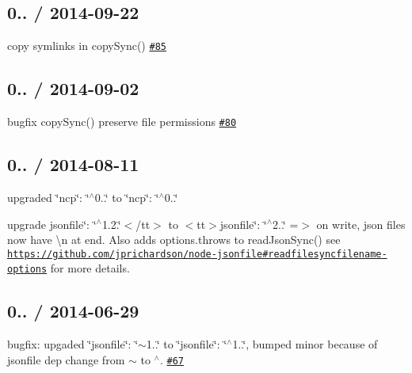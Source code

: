 \subsection*{0.. / 2014-\/09-\/22 }


\begin{DoxyItemize}
\item copy symlinks in {\ttfamily copy\+Sync()} \href{https://github.com/jprichardson/node-fs-extra/pull/85}{\tt \#85}
\end{DoxyItemize}

\subsection*{0.. / 2014-\/09-\/02 }


\begin{DoxyItemize}
\item bugfix {\ttfamily copy\+Sync()} preserve file permissions \href{https://github.com/jprichardson/node-fs-extra/pull/80}{\tt \#80}
\end{DoxyItemize}

\subsection*{0.. / 2014-\/08-\/11 }


\begin{DoxyItemize}
\item upgraded {\ttfamily \char`\"{}ncp\char`\"{}\+: \char`\"{}$^\wedge$0..\char`\"{}} to {\ttfamily \char`\"{}ncp\char`\"{}\+: \char`\"{}$^\wedge$0..\char`\"{}}
\item upgrade {\ttfamily jsonfile\char`\"{}\+: \char`\"{}$^\wedge$1.2.\char`\"{}$<$/tt$>$ to $<$tt$>$jsonfile\char`\"{}\+: \char`\"{}$^\wedge$2..\char`\"{}} =$>$ on write, json files now have {\ttfamily \textbackslash{}n} at end. Also adds {\ttfamily options.\+throws} to {\ttfamily read\+Json\+Sync()} see \href{https://github.com/jprichardson/node-jsonfile#readfilesyncfilename-options}{\tt https\+://github.\+com/jprichardson/node-\/jsonfile\#readfilesyncfilename-\/options} for more details.
\end{DoxyItemize}

\subsection*{0.. / 2014-\/06-\/29 }


\begin{DoxyItemize}
\item bugfix\+: upgaded {\ttfamily \char`\"{}jsonfile\char`\"{}\+: \char`\"{}$\sim$1..\char`\"{}} to {\ttfamily \char`\"{}jsonfile\char`\"{}\+: \char`\"{}$^\wedge$1..\char`\"{}}, bumped minor because of {\ttfamily jsonfile} dep change from {\ttfamily $\sim$} to {\ttfamily $^\wedge$}. \href{https://github.com/jprichardson/node-fs-extra/issues/67}{\tt \#67}
\end{DoxyItemize}

